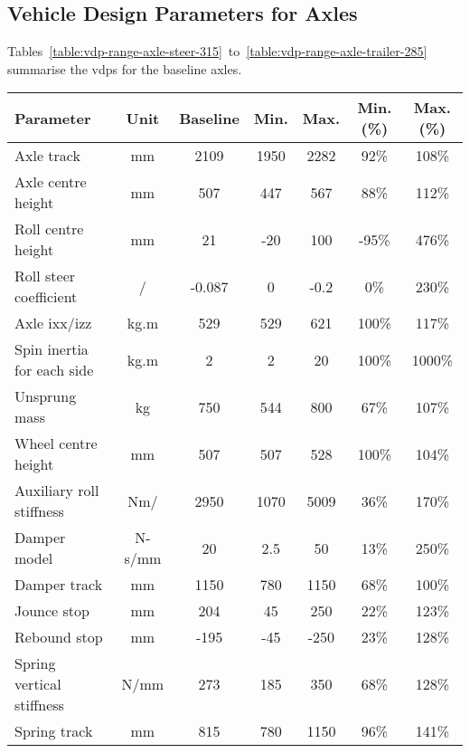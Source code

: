 
\subsection{Vehicle Design Parameters for Axles}\label{section:summary-of-axle-design-parameters}

Tables~\ref{table:vdp-range-axle-steer-315}~to~\ref{table:vdp-range-axle-trailer-285} summarise the \glspl{vdp} for the baseline axles.

\begin{table}[H]
	\centering\footnotesize
	\begin{threeparttable}

		\begin{tabulary}{\textwidth}{lcccccc}
			\toprule
			\textbf{Parameter} & \textbf{Unit} & \textbf{Baseline} & \textbf{Min.} & \textbf{Max.} & \textbf{Min. (\%)} & \textbf{Max. (\%)} \\

			\midrule
			Axle track & mm    & 2109  & 1950  & 2282  & 92\%  & 108\% \\
			Axle centre height & mm    & 507   & 447   & 567   & 88\%  & 112\% \\
			Roll centre height & mm    & 21    & -20   & 100   & -95\% & 476\% \\
			Roll steer coefficient & \degree{}/\degree{} & -0.087 & 0     & -0.2  & 0\%   & 230\% \\
			Axle \gls{ixx}/\gls{izz}  & kg.m\sstw{} & 529   & 529   & 621   & 100\% & 117\% \\
			Spin inertia for each side & kg.m\sstw{} & 2     & 2     & 20    & 100\% & 1000\% \\
			Unsprung mass  & kg    & 750   & 544   & 800   & 67\%  & 107\% \\
			Wheel centre height & mm    & 507   & 507   & 528   & 100\% & 104\% \\
			Auxiliary roll stiffness  & Nm/\degree{} & 2950  & 1070  & 5009  & 36\%  & 170\% \\
			Damper model & N-s/mm & 20    & 2.5   & 50    & 13\%  & 250\% \\
			Damper track & mm    & 1150  & 780   & 1150  & 68\%  & 100\% \\
			Jounce stop & mm    & 204   & 45    & 250   & 22\%  & 123\% \\
			Rebound stop & mm    & -195  & -45   & -250  & 23\%  & 128\% \\
			Spring vertical stiffness & N/mm  & 273   & 185   & 350   & 68\%  & 128\% \\
			Spring track & mm    & 815   & 780   & 1150  & 96\%  & 141\% \\


\end{tabulary}
\end{threeparttable}
\end{table}
